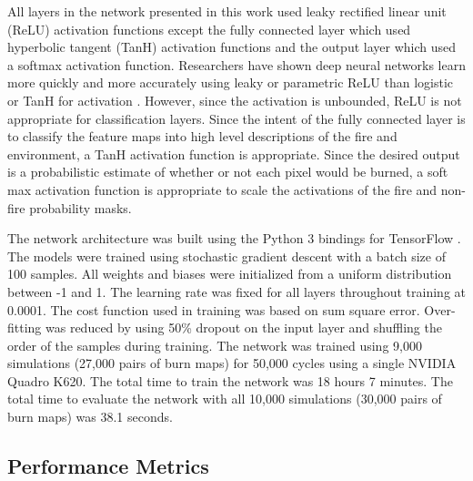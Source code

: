 \documentclass[smallcondensed]{svjour3}     %
\begin{document}
All layers in the network presented in this work used leaky rectified linear
unit (ReLU) activation functions except the fully connected layer which used
hyperbolic tangent (TanH) activation functions and the output layer which used
a softmax activation function.
Researchers have shown deep neural networks learn more quickly and more
accurately using leaky or parametric ReLU than logistic or TanH for activation
\cite{maas2013rectifier,he2015delving}.
However, since the activation is unbounded, ReLU is not appropriate for
classification layers.
Since the intent of the fully connected layer is to classify the feature maps into
high level descriptions of the fire and environment, a TanH activation function
is appropriate.
Since the desired output is a probabilistic estimate of whether or not each
pixel would be burned, a soft max activation function is appropriate to scale the
activations of the fire and non-fire probability masks.


The network architecture was built using the Python 3 bindings for TensorFlow
\cite{tensorflow2015-whitepaper}. The models were trained using stochastic
gradient descent with a batch size of 100 samples. All weights and biases were
initialized from a uniform distribution between -1 and 1. The learning rate was
fixed for all layers throughout training at 0.0001.
The cost function used in training was based on sum square error.
Over-fitting was reduced by using 50\% dropout on the input layer and shuffling
the order of the samples during training.
The network was trained using 9,000 simulations (27,000 pairs of burn maps)
for 50,000 cycles
using a single NVIDIA Quadro K620. The total time to train the network was
18 hours 7 minutes. The total time to evaluate the network with all 10,000
simulations (30,000 pairs of burn maps) was 38.1 seconds.





\subsection{Performance Metrics}
\label{ss:PM}
\end{document}
